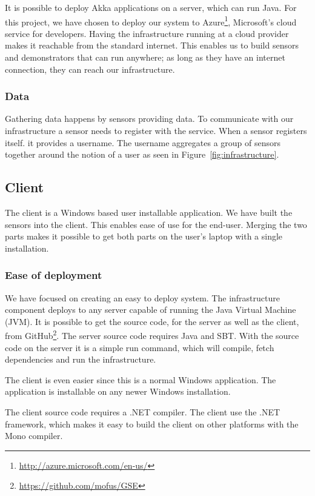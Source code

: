 \documentclass{sigchi}
\begin{document}
It is possible to deploy Akka applications on a server, which can run Java.
For this project, we have chosen to deploy our system to Azure\footnote{\url{http://azure.microsoft.com/en-us/}}, Microsoft's cloud service for developers.
Having the infrastructure running at a cloud provider makes it reachable from the standard internet.
This enables us to build sensors and demonstrators that can run anywhere; as long as they have an internet connection, they can reach our infrastructure.

\subsubsection{Data}
Gathering data happens by sensors providing data.
To communicate with our infrastructure a sensor needs to register with the service.
When a sensor registers itself. it provides a username.
The username aggregates a group of sensors together around the notion of a user as seen in Figure~\ref{fig:infrastructure}.

\subsection{Client}
The client is a Windows based user installable application.
We have built the sensors into the client.
This enables ease of use for the end-user.
Merging the two parts makes it possible to get both parts on the user's laptop with a single installation.

\subsubsection{Ease of deployment}
We have focused on creating an easy to deploy system.
The infrastructure component deploys to any server capable of running the Java Virtual Machine (JVM).
It is possible to get the source code, for the server as well as the client, from GitHub\footnote{\url{https://github.com/mofus/GSE}}.
The server source code requires Java and SBT.
With the source code on the server it is a simple run command, which will compile, fetch dependencies and run the infrastructure.

The client is even easier since this is a normal Windows application.
The application is installable on any newer Windows installation.

The client source code requires a .NET compiler.
The client use the .NET framework, which makes it easy to build the client on other platforms with the Mono compiler.
\end{document}
